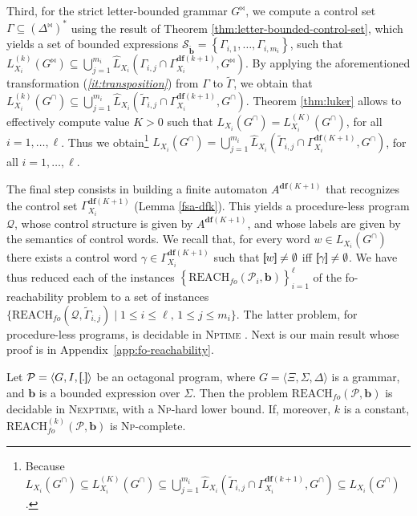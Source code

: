 \documentclass[final]{llncs}
\newcommand{\rbr}{{\bf ]\!\!]}}
\newcommand{\lbr}{{\bf [\!\![}}
\newcommand{\sem}[1]{\lbr #1 \rbr}
\def\set#1{{\left\{ #1 \right\}}}
\def\tuple#1{{\langle #1 \rangle}}
\def\prod{\Delta}
\def\pat{{\mathbf{b}}}
\def\patt{{\widetilde{\mathbf{b}}}}
\def\df#1{\scriptscriptstyle\mathbf{df}(#1)}
\def\Vars{\ensuremath{\Xi}}
\def\foreach{\mathrm{REACH}_{\mathit{fo}}}
\begin{document}
Third, for the strict letter-bounded grammar \(G^\bowtie\), we compute
a control set \(\Gamma \subseteq (\prod^{\bowtie})^*\) using the
result of Theorem \ref{thm:letter-bounded-control-set}, which yields
a set of bounded expressions \(\mathcal{S}_\patt = \set{\Gamma_{i,
1}, \ldots, \Gamma_{i, m_i}}\), such
that \(L_{X_i}^{(k)}(G^\bowtie) \subseteq \bigcup_{j=1}^{m_i}
\hat{L}_{X_i}(\Gamma_{i, j} \cap \Gamma_{X_i}^{\df{k+1}}, G^\bowtie)\). 
By applying the aforementioned transformation
({\itshape\ref{it:transposition}}) from \(\Gamma\)
to \(\widetilde{\Gamma}\), we obtain
that \(L^{(k)}_{X_i}(G^\cap) \subseteq \bigcup_{j=1}^{m_i}
\hat{L}_{X_i}(\widetilde{\Gamma}_{i, j} \cap \Gamma_{X_i}^{\df{k+1}}, G^\cap)\).
Theorem \ref{thm:luker} allows to effectively compute value \(K>0\)
such that \(L_{X_i}(G^\cap) = L_{X_i}^{(K)}(G^\cap)\), for
all \(i=1,\ldots,\ell\). Thus we obtain\footnote{Because
\(L_{X_i}(G^\cap) \subseteq L_{X_i}^{(K)}(G^\cap) \subseteq \bigcup_{j=1}^{m_i} 
\hat{L}_{X_i}(\widetilde{\Gamma}_{i, j} \cap \Gamma_{X_i}^{\df{k+1}}, G^\cap) \subseteq L_{X_i}(G^\cap)\) .}
\(L_{X_i}(G^\cap) = \bigcup_{j=1}^{m_i}  \hat{L}_{X_i}(\widetilde{\Gamma}_{i, j} 
\cap \Gamma_{X_i}^{\df{K+1}}, G^\cap)\), for all \(i=1,\ldots,\ell\).

The final step consists in building a finite
automaton \(A^{\df{K+1}}\) that recognizes the control
set \(\Gamma_{X_i}^{\df{K+1}}\) (Lemma \ref{fsa-dfk}). This yields a
procedure-less program \(\mathcal{Q}\), whose control structure is
given by \(A^{\df{K+1}}\), and whose labels are given by the semantics
of control words. We recall that, for every word \(w \in
L_{X_i}(G^\cap)\) there exists a control
word \(\gamma \in \Gamma_{X_i}^{\df{K+1}}\) such
that \(\sem{w}\neq\emptyset\) if{}f \(\sem{\gamma}\neq\emptyset\). We
have thus reduced each of the
instances \(\set{\foreach(\mathcal{P}_i,\pat)}_{i=1}^\ell\) of the
fo-reachability problem to a set of
instances \(\{\foreach(\mathcal{Q},\widetilde{\Gamma}_{i, j}) \mid 1\leq i\leq \ell,\, 1\leq j\leq m_i\}\). The
latter problem, for procedure-less programs, is decidable in
\textsc{Nptime} \cite{bik14}. Next is our main result whose proof is in Appendix~\ref{app:fo-reachability}.

\begin{theorem}\label{thm:fo-reachability}
Let \(\mathcal{P}=\tuple{G,I,\sem{.}}\) be an octagonal program,
where \(G=\tuple{\Vars,\Sigma,\prod}\) is a grammar, and \(\pat\) is a
bounded expression over \(\Sigma\). Then the
problem \(\foreach(\mathcal{P}, \pat)\) is decidable
in \textsc{Nexptime}, with a \textsc{Np}-hard lower bound.  If,
moreover, \(k\) is a constant, \(\foreach^{(k)}(\mathcal{P},\pat)\) is \textsc{Np}-complete.
\end{theorem}
\end{document}
